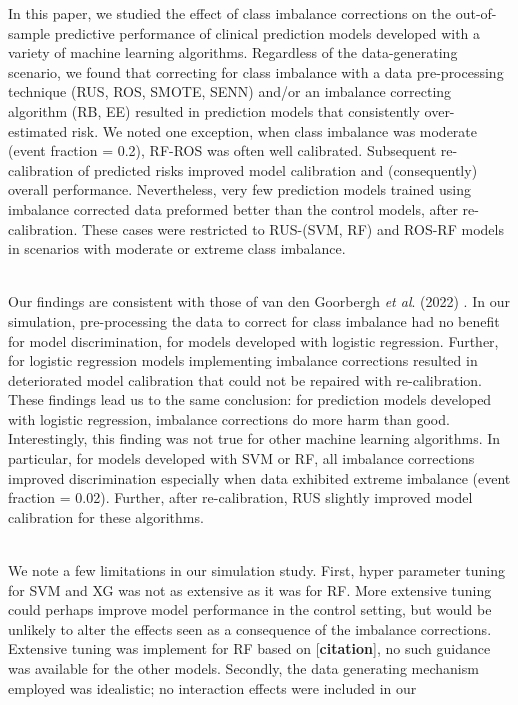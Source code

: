 \documentclass[AMA,STIX1COL,]{WileyNJD-v2}
\begin{document}
In this paper, we studied the effect of class imbalance corrections on
the out-of-sample predictive performance of clinical prediction models
developed with a variety of machine learning algorithms. Regardless of
the data-generating scenario, we found that correcting for class
imbalance with a data pre-processing technique (RUS, ROS, SMOTE, SENN)
and/or an imbalance correcting algorithm (RB, EE) resulted in prediction
models that consistently over-estimated risk. We noted one exception,
when class imbalance was moderate (event fraction = 0.2), RF-ROS was
often well calibrated. Subsequent re-calibration of predicted risks
improved model calibration and (consequently) overall performance.
Nevertheless, very few prediction models trained using imbalance
corrected data preformed better than the control models, after
re-calibration. These cases were restricted to RUS-(SVM, RF) and ROS-RF
models in scenarios with moderate or extreme class imbalance.\\
\strut \\
Our findings are consistent with those of van den Goorbergh
\emph{et al}. (2022) \citep{ruben}. In our simulation, pre-processing
the data to correct for class imbalance had no benefit for model
discrimination, for models developed with logistic regression. Further,
for logistic regression models implementing imbalance corrections
resulted in deteriorated model calibration that could not be repaired
with re-calibration. These findings lead us to the same conclusion: for
prediction models developed with logistic regression, imbalance
corrections do more harm than good. Interestingly, this finding was not
true for other machine learning algorithms. In particular, for models
developed with SVM or RF, all imbalance corrections improved
discrimination especially when data exhibited extreme imbalance (event
fraction = 0.02). Further, after re-calibration, RUS slightly improved
model calibration for these algorithms.\\
\strut \\
We note a few limitations in our simulation study. First, hyper
parameter tuning for SVM and XG was not as extensive as it was for RF.
More extensive tuning could perhaps improve model performance in the
control setting, but would be unlikely to alter the effects seen as a
consequence of the imbalance corrections. Extensive tuning was implement
for RF based on {[}\textbf{citation}{]}, no such guidance was available
for the other models. Secondly, the data generating mechanism employed
was idealistic; no interaction effects were included in our
\end{document}
